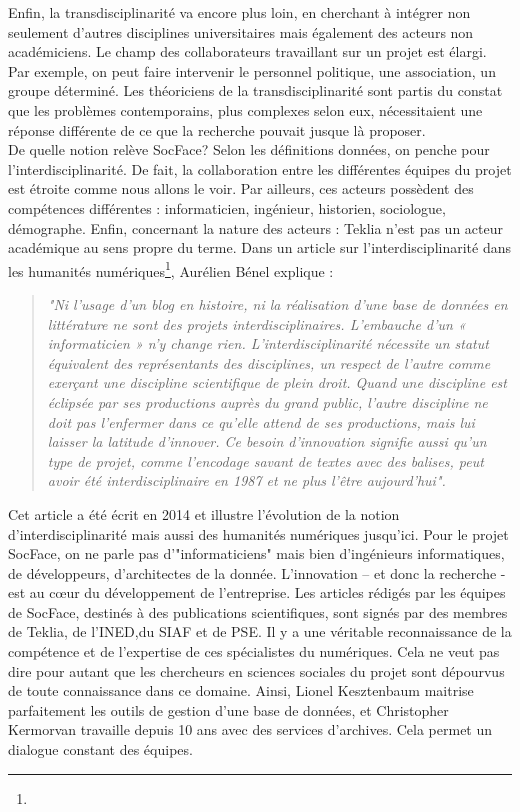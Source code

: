 Enfin, la transdisciplinarité va encore plus loin, en cherchant à intégrer non seulement d’autres disciplines universitaires mais également des acteurs non académiciens. Le champ des collaborateurs travaillant sur un projet est élargi. Par exemple, on peut faire intervenir le personnel politique, une association, un groupe déterminé. Les théoriciens de la transdisciplinarité sont partis du constat que les problèmes contemporains, plus complexes selon eux, nécessitaient une réponse différente de ce que la recherche pouvait jusque là proposer.\\

De quelle notion relève SocFace? Selon les définitions données, on penche pour l’interdisciplinarité. De fait, la collaboration entre les différentes équipes du projet est étroite comme nous allons le voir. Par ailleurs, ces acteurs possèdent des compétences différentes : informaticien, ingénieur, historien, sociologue, démographe. Enfin, concernant la nature des acteurs : Teklia n’est pas un acteur académique au sens propre du terme. Dans un article sur l’interdisciplinarité dans les humanités numériques\footnote{}, Aurélien Bénel explique : 
\begin{quote}
\textit{"Ni l’usage d’un blog en histoire, ni la réalisation d’une base de données en littérature ne sont des projets interdisciplinaires. L’embauche d’un « informaticien » n’y change rien. L’interdisciplinarité nécessite un statut équivalent des représentants des disciplines, un respect de l’autre comme exerçant une discipline scientifique de plein droit. Quand une discipline est éclipsée par ses productions auprès du grand public, l’autre discipline ne doit pas l’enfermer dans ce qu’elle attend de ses productions, mais lui laisser la latitude d’innover. Ce besoin d’innovation signifie aussi qu’un type de projet, comme l’encodage savant de textes avec des balises, peut avoir été interdisciplinaire en 1987 et ne plus l’être aujourd’hui".}
\end{quote}
Cet article a été écrit en 2014 et illustre l’évolution de la notion d’interdisciplinarité mais aussi des humanités numériques jusqu’ici. Pour le projet SocFace, on ne parle pas d’"informaticiens" mais bien d’ingénieurs informatiques, de développeurs, d’architectes de la donnée. L’innovation – et donc la recherche - est au cœur du développement de l’entreprise. Les articles rédigés par les équipes de SocFace, destinés à des publications scientifiques, sont signés par des membres de Teklia, de l’\gls{INED},du \gls{SIAF} et de \gls{PSE}. Il y a une véritable reconnaissance de la compétence et de l’expertise de ces spécialistes du numériques. Cela ne veut pas dire pour autant que les chercheurs en sciences sociales du projet sont dépourvus de toute connaissance dans ce domaine. Ainsi, Lionel Kesztenbaum maitrise parfaitement les outils de gestion d’une base de données, et Christopher Kermorvan travaille depuis 10 ans avec des services d'archives. Cela permet un dialogue constant des équipes.\\

